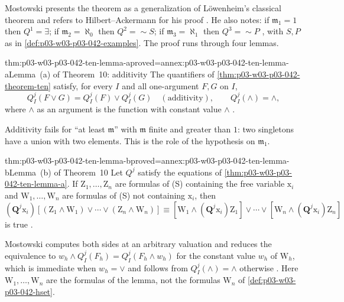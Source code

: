 Mostowski presents the theorem as a generalization of L\"owenheim's
classical theorem and refers to Hilbert--Ackermann for his proof
\cite[p.~29, note~11]{Mostowski1957}.  He also notes: if
\(\mathfrak m_1=1\) then \(Q^1=\exists\); if \(\mathfrak m_2=\aleph_0\)
then \(Q^2={\sim}S\); if \(\mathfrak m_3=\aleph_1\) then \(Q^3={\sim}P\)
\cite[p.~29]{Mostowski1957}, with \(S,P\) as in
\cref{def:p03-w03-p03-042-examples}.  The proof runs through four
lemmas.

\begin{hblemma}{thm:p03-w03-p03-042-ten-lemma-a}{proved=annex:p03-w03-p03-042-ten-lemma-a}{Lemma~(a) of Theorem~10: additivity}
The quantifiers of \cref{thm:p03-w03-p03-042-theorem-ten} satisfy, for
every \(I\) and all one-argument \(F,G\) on \(I\),
\[
 Q^j_I(F\vee G)=Q^j_I(F)\vee Q^j_I(G)\quad(\text{additivity}),\qquad
 Q^j_I(\wedge)=\wedge,
\]
where \(\wedge\) as an argument is the function with constant value
\(\wedge\) \cite[p.~29]{Mostowski1957}.
\end{hblemma}

Additivity fails for ``at least \(\mathfrak m\)'' with \(\mathfrak m\)
finite and greater than \(1\): two singletons have a union with two
elements.  This is the role of the hypothesis on \(\mathfrak m_1\).

\begin{hblemma}{thm:p03-w03-p03-042-ten-lemma-b}{proved=annex:p03-w03-p03-042-ten-lemma-b}{Lemma~(b) of Theorem~10}
Let \(Q^j\) satisfy the equations of
\cref{thm:p03-w03-p03-042-ten-lemma-a}.  If \(\mathrm Z_1,\ldots,\mathrm
Z_n\) are formulas of (S) containing the free variable \(\mathrm x_i\)
and \(\mathrm W_1,\ldots,\mathrm W_n\) are formulas of (S) not containing
\(\mathrm x_i\), then
\[
 (\mathbf Q^j\mathrm x_i)[(\mathrm Z_1\wedge\mathrm W_1)\vee\cdots\vee
 (\mathrm Z_n\wedge\mathrm W_n)]\equiv
 [\mathrm W_1\wedge(\mathbf Q^j\mathrm x_i)\mathrm Z_1]\vee\cdots\vee
 [\mathrm W_n\wedge(\mathbf Q^j\mathrm x_i)\mathrm Z_n]
\]
is true \cite[p.~29]{Mostowski1957}.
\end{hblemma}

Mostowski computes both sides at an arbitrary valuation and reduces the
equivalence to \(w_h\wedge Q^j_I(F_h)=Q^j_I(F_h\wedge w_h)\) for the
constant value \(w_h\) of \(\mathrm W_h\), which is immediate when
\(w_h=\vee\) and follows from \(Q^j_I(\wedge)=\wedge\) otherwise
\cite[pp.~29--30]{Mostowski1957}.  Here \(\mathrm W_1,\ldots,\mathrm W_n\)
are the formulas of the lemma, not the formulas \(\mathrm W_n\) of
\cref{def:p03-w03-p03-042-hset}.


